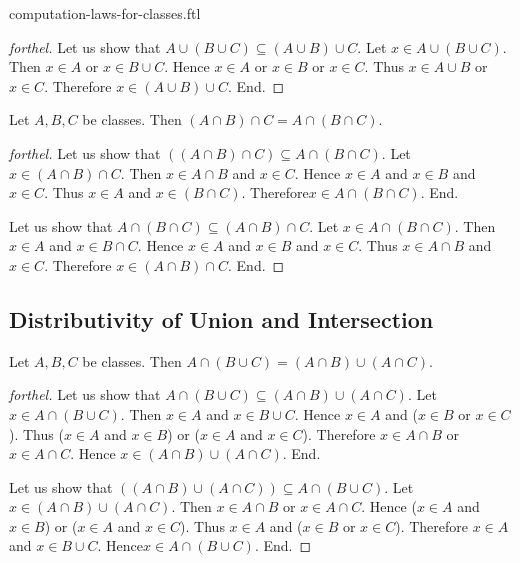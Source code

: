 \documentclass{naproche-library}
\begin{document}
\begin{smodule}{computation-laws-for-classes.ftl}
\begin{proof}[forthel]
    Let us show that $A \cup (B \cup C) \subseteq (A \cup B) \cup C$.
      Let $x \in A \cup (B \cup C)$.
      Then $x \in A$ or $x \in B \cup C$.
      Hence $x \in A$ or $x \in B$ or $x \in C$.
      Thus $x \in A \cup B$ or $x \in C$.
      Therefore $x \in (A \cup B) \cup C$.
    End.
  \end{proof}

  \begin{proposition}[forthel,id=FOUNDATIONS_02_906751977193472]
    Let $A, B, C$ be classes.
    Then $(A \cap B) \cap C = A \cap (B \cap C)$.
  \end{proposition}
  \begin{proof}[forthel]
    Let us show that $((A \cap B) \cap C) \subseteq A \cap (B \cap C)$. %
      Let $x \in (A \cap B) \cap C$.
      Then $x \in A \cap B$ and $x \in C$.
      Hence $x \in A$ and $x \in B$ and $x \in C$.
      Thus $x \in A$ and $x \in (B \cap C)$.
      Therefore$ x \in A \cap (B \cap C)$.
    End.

    Let us show that $A \cap (B \cap C) \subseteq (A \cap B) \cap C$.
      Let $x \in A \cap (B \cap C)$.
      Then $x \in A$ and $x \in B \cap C$.
      Hence $x \in A$ and $x \in B$ and $x \in C$.
      Thus $x \in A \cap B$ and $x \in C$.
      Therefore $x \in (A \cap B) \cap C$.
    End.
  \end{proof}


  \subsection*{Distributivity of Union and Intersection}

  \begin{proposition}[forthel,id=FOUNDATIONS_02_371139087958016]
    Let $A, B, C$ be classes.
    Then $A \cap (B \cup C) = (A \cap B) \cup (A \cap C)$.
  \end{proposition}
  \begin{proof}[forthel]
    Let us show that $A \cap (B \cup C) \subseteq (A \cap B) \cup (A \cap C)$.
      Let $x \in A \cap (B \cup C)$.
      Then $x \in A$ and $x \in B \cup C$.
      Hence $x \in A$ and ($x \in B$ or $x \in C$).
      Thus ($x \in A$ and $x \in B$) or ($x \in A$ and $x \in C$).
      Therefore $x \in A \cap B$ or $x \in A \cap C$.
      Hence $x \in (A \cap B) \cup (A \cap C)$.
    End.

    Let us show that $((A \cap B) \cup (A \cap C)) \subseteq A \cap (B \cup C)$. %
      Let $x \in (A \cap B) \cup (A \cap C)$.
      Then $x \in A \cap B$ or $x \in A \cap C$.
      Hence ($x \in A$ and $x \in B$) or ($x \in A$ and $x \in C$).
      Thus $x \in A$ and ($x \in B$ or $x \in C$).
      Therefore $x \in A$ and $x \in B \cup C$.
      Hence$ x \in A \cap (B \cup C)$.
    End.
  \end{proof}


\end{smodule}
\end{document}
